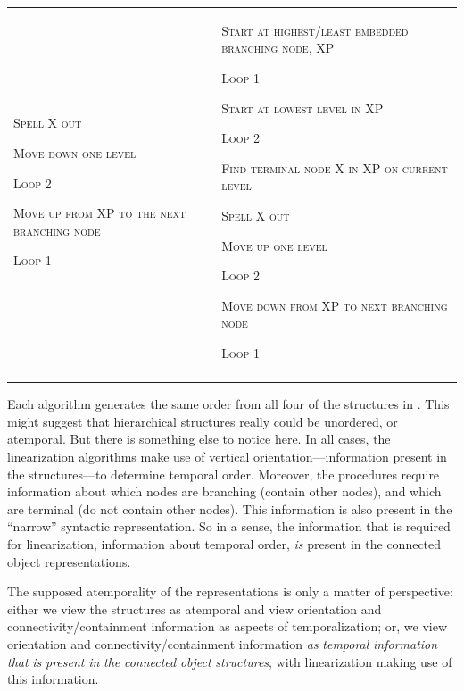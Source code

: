 \begin{tabularx}{\textwidth}{XX}
         \textsc{Spell} \textsc{X} \textsc{out}

         \textsc{Move} \textsc{down} \textsc{one} \textsc{level}

      \textsc{Loop} \textsc{2}

      \textsc{Move} \textsc{up} \textsc{from} \textsc{XP} \textsc{to} \textsc{the} \textsc{next} \textsc{branching} \textsc{node}

\textsc{Loop} \textsc{1} & \textsc{Start} \textsc{at} \textsc{highest}\textsc{/}\textsc{least} \textsc{embedded} \textsc{branching} \textsc{node,} \textsc{XP}

\textsc{Loop} \textsc{1}

      \textsc{Start} \textsc{at} \textsc{lowest} \textsc{level} \textsc{in} \textsc{XP}

      \textsc{Loop} \textsc{2}

         \textsc{Find} \textsc{terminal} \textsc{node} \textsc{X} \textsc{in} \textsc{XP} \textsc{on} \textsc{current} \textsc{level}

         \textsc{Spell} \textsc{X} \textsc{out}

         \textsc{Move} \textsc{up} \textsc{one} \textsc{level}

      \textsc{Loop} \textsc{2}

      \textsc{Move} \textsc{down} \textsc{from} \textsc{XP} \textsc{to} \textsc{next} \textsc{branching} \textsc{node}

\textsc{Loop} \textsc{1}\\
\lspbottomrule
\end{tabularx}
  Each algorithm generates the same order from all four of the structures in . This might suggest that hierarchical structures really could be unordered, or atemporal. But there is something else to notice here. In all cases, the linearization algorithms make use of vertical orientation—information present in the structures—to determine temporal order. Moreover, the procedures require information about which nodes are branching (contain other nodes), and which are terminal (do not contain other nodes). This information is also present in the “narrow” syntactic representation. So in a sense, the information that is required for linearization, information about temporal order, \textit{is} present in the connected object representations. 

  The supposed atemporality of the representations is only a matter of perspective: either we view the structures as atemporal and view orientation and connectivity/containment information as aspects of temporalization; or, we view orientation and connectivity/containment information \textit{as} \textit{temporal} \textit{information} \textit{that} \textit{is} \textit{present} \textit{in} \textit{the} \textit{connected} \textit{object} \textit{structures}, with linearization making use of this information. 

